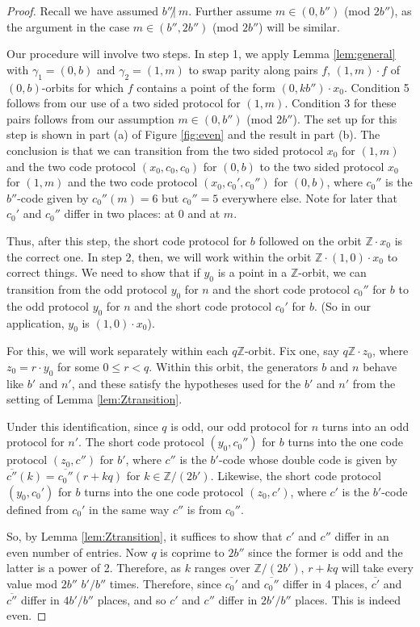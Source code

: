 \documentclass[10pt,a4paper]{article}
\newcommand{\0}{\varnothing}
\newcommand{\Z}{\mathbb{Z}}
\begin{document}
\begin{proof}
Recall we have assumed $b'' \not|\ m$. Further assume $m \in (0,b'')$ (mod $2b''$), as the argument in the case $m \in (b'',2b'')$ (mod $2b''$) will be similar.

Our procedure will involve two steps. In step 1, we apply Lemma \ref{lem:general} with $\gamma_1 = (0,b)$ and $\gamma_2 = (1,m)$ to swap parity along pairs $f$, $(1,m) \cdot f$ of $(0,b)$-orbits for which $f$ contains a point of the form $(0,kb'') \cdot x_0$. Condition 5 follows from our use of a two sided protocol for $(1,m)$. Condition 3 for these pairs follows from our assumption $m \in (0,b'')$ (mod $2b''$). The set up for this step is shown in part (a) of Figure \ref{fig:even} and the result in part (b). The conclusion is that we can transition from the two sided protocol $x_0$ for $(1,m)$ and the two code protocol $(x_0,c_0,c_0)$ for $(0,b)$ to the two sided protocol $x_0$ for $(1,m)$ and the two code protocol $(x_0,c_0',c_0'')$ for $(0,b)$, where $c_0''$ is the $b''$-code given by $c_0''(m) = 6$ but $c_0'' = 5$ everywhere else. Note for later that $c_0'$ and $c_0''$ differ in two places: at 0 and at $m$.

Thus, after this step, the short code protocol for $b$ followed on the orbit $\Z \cdot x_0$ is the correct one. In step 2, then, we will work within the orbit $\Z \cdot (1,0) \cdot x_0$ to correct things. We need to show that if $y_0$ is a point in a $\Z$-orbit, we can transition from the odd protocol $y_0$ for $n$ and the short code protocol $c_0''$ for $b$ to the odd protocol $y_0$ for $n$ and the short code protocol $c_0'$ for $b$. (So in our application, $y_0$ is $(1,0) \cdot x_0$). 

For this, we will work separately within each $q\Z$-orbit. Fix one, say $q\Z \cdot z_0$, where $z_0 = r \cdot y_0$ for some $0 \leq r < q$. Within this orbit, the generators $b$ and $n$ behave like $b'$ and $n'$, and these satisfy the hypotheses used for the $b'$ and $n'$ from the setting of Lemma \ref{lem:Ztransition}. 

Under this identification, since $q$ is odd, our odd protocol for $n$ turns into an odd protocol for $n'$. The short code protocol $(y_0,c_0'')$ for $b$ turns into the one code protocol $(z_0,c'')$ for $b'$, where $c''$ is the $b'$-code whose double code is given by $\overline{c''}(k) = \overline{c_0''}(r+kq)$ for $k \in \Z/(2b')$. Likewise, the short code protocol $(y_0,c_0')$ for $b$ turns into the one code protocol $(z_0,c')$, where $c'$ is the $b'$-code defined from $c_0'$ in the same way $c''$ is from $c_0''$.

So, by Lemma \ref{lem:Ztransition}, it suffices to show that $c'$ and $c''$ differ in an even number of entries. Now $q$ is coprime to $2b''$ since the former is odd and the latter is a power of 2. Therefore, as $k$ ranges over $\Z/(2b')$, $r+kq$ will take every value mod $2b''$ $b'/b''$ times. Therefore, since $\overline{c_0'}$ and $\overline{c_0''}$ differ in 4 places, $\overline{c'}$ and $\overline{c''}$ differ in $4b'/b''$ places, and so $c'$ and $c''$ differ in $2b'/b''$ places. This is indeed even.
\end{proof}
\end{document}
